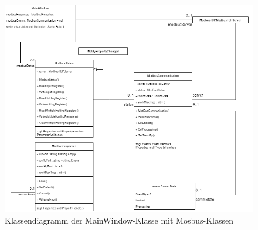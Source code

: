     \begin{figure}[h]
        \label{fig:figure4}
        \includegraphics[width = \textwidth ]{Bilder/LV_Klassendiagramm_Modbus}
        \caption[Klassendiagramm Modbus ]%
        {\small Klassendiagramm der MainWindow-Klasse mit Mosbus-Klassen }
        \centering
    \end{figure}

